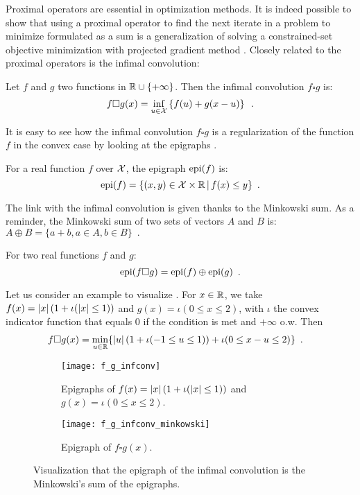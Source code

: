\documentclass[../main.tex]{subfiles}
\begin{document}
Proximal operators are essential in optimization methods. It is indeed possible
to show \citep[p.~270]{Beck17} that using a proximal operator to find the next
iterate in a problem to minimize formulated as a sum
is a generalization of solving a constrained-set objective minimization with
projected gradient method \citep{combettes2011proximal}.
Closely related to the proximal operators is the infimal convolution:

\begin{definition}\label{def:infconv}
	Let $f$ and $g$ two functions in $\mathbb{R} \cup \{+\infty\}$.
	Then the infimal convolution $f\square g$ is:
	\begin{equation}
		f\square g(x)
		= \inf_{u\in\mathcal{X}} \left\{f(u) + g(x-u) \right\}\enspace.
	\end{equation}
\end{definition}

It is easy to see how the infimal convolution $f\square g$ is a regularization
of the function $f$ in the convex case by looking at
the epigraphs \citep{fajardo2012infimal}.
\begin{definition}\label{def:epigraph}
For a real function $f$ over $\mathcal{X}$, the epigraph $\operatorname{epi}(f)$ is:
\[\operatorname{epi}(f)=\{(x, y)\in \mathcal{X}\times \mathbb{R}\,|\, f(x)\leq y\}\enspace.\]
\end{definition}
The link with the infimal convolution is given thanks to the Minkowski sum.
As a reminder, the Minkowski sum of two sets of vectors $A$ and $B$ is:
$A\oplus B = \{a+b, a\in A, b\in B\}\enspace.$

\begin{proposition*}
    For two real functions $f$ and $g$:
    \begin{equation}\label{prop:epi}
    \operatorname{epi}(f\square g) = \operatorname{epi}(f)\oplus \operatorname{epi}(g)\enspace.
    \end{equation}
\end{proposition*}

Let us consider an example to visualize .
For $x\in\mathbb{R}$, we take $f(x)=\left \vert x \right \vert(1+\iota(\left \vert x \right \vert\leq 1))$ and
$g(x)=\iota(0\leq x \leq 2)$, with $\iota$ the convex indicator function that
equals $0$ if the condition is met and $+\infty$ o.w.
Then
\begin{align*}
    f\square g(x)
	&= \min_{u\in\mathbb{R}} \{\left \vert u \right \vert (1 + \iota (-1\leq u \leq 1))
	+ \iota(0\leq x-u\leq 2)\}
	\enspace.
\end{align*}

\begin{figure}[h!]
	\centering
	\begin{subfigure}{.4\textwidth}
		\centering
		\texttt{[image: f\_g\_infconv]}
		\caption{Epigraphs of $f(x)=\left \vert x \right \vert(1+\iota(\left \vert x \right \vert\leq 1))$ and
		$g(x)=\iota(0\leq x \leq 2)$.}
	\end{subfigure}
	\begin{subfigure}{.4\textwidth}
		\centering
		\texttt{[image: f\_g\_infconv\_minkowski]}
		\caption{Epigraph of $f\square g(x)$.}
	\end{subfigure}
	\caption{Visualization that the epigraph of the infimal convolution is the
	Minkowski's sum of the epigraphs.}
\end{figure}
\end{document}

